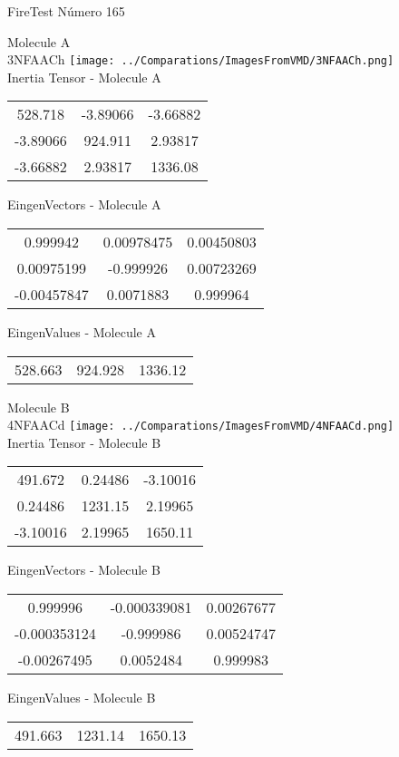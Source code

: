 \vtab[-2cm]
\begin{center}
{\large FireTest \tab Número 165}
\end{center}
\begin{multicols}{2}
\begin{center}

Molecule A \\ 
3NFAACh
\texttt{[image: ../Comparations/ImagesFromVMD/3NFAACh.png]}
\\
Inertia Tensor - Molecule A \\
\vtab

\begin{tabular}{|c c c|}
528.718	 & 	-3.89066	 & 	-3.66882	 \\
-3.89066	 & 	924.911	 & 	2.93817	 \\
-3.66882	 & 	2.93817	 & 	1336.08
\end{tabular}

\vtab
 EingenVectors - Molecule A     \\
\vtab
\begin{tabular}{|c c c|}
0.999942	 & 	0.00978475	 & 	0.00450803	 \\
0.00975199	 & 	-0.999926	 & 	0.00723269	 \\
-0.00457847	 & 	0.0071883	 & 	0.999964
\end{tabular}

\vtab
 EingenValues - Molecule A     \\
\vtab
\begin{tabular}{|c c c|}
528.663	 & 	924.928	 & 	1336.12	 \\
\end{tabular}
\columnbreak

Molecule B \\ 
4NFAACd
\texttt{[image: ../Comparations/ImagesFromVMD/4NFAACd.png]}
\\
Inertia Tensor - Molecule B \\
\vtab

\begin{tabular}{|c c c|}
491.672	 & 	0.24486	 & 	-3.10016	 \\
0.24486	 & 	1231.15	 & 	2.19965	 \\
-3.10016	 & 	2.19965	 & 	1650.11
\end{tabular}

\vtab
 EingenVectors - Molecule B     \\
\vtab
\begin{tabular}{|c c c|}
0.999996	 & 	-0.000339081	 & 	0.00267677	 \\
-0.000353124	 & 	-0.999986	 & 	0.00524747	 \\
-0.00267495	 & 	0.0052484	 & 	0.999983
\end{tabular}

\vtab
 EingenValues - Molecule B     \\
\vtab
\begin{tabular}{|c c c|}
491.663	 & 	1231.14	 & 	1650.13	 \\
\end{tabular}

\end{center}
\end{multicols}

